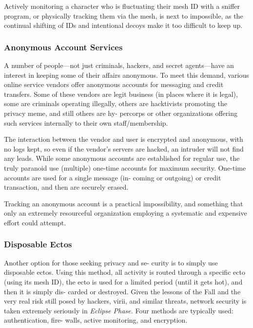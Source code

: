 Actively monitoring a character who is fluctuating 
their mesh ID with a sniffer program, or physically 
tracking them via the mesh, is next to impossible, as 
the continual shifting of IDs and intentional decoys 
make it too difficult to keep up.

\subsubsection{Anonymous Account Services}

A number of people—not just criminals, hackers, and 
secret agents—have an interest in keeping some of 
their affairs anonymous. To meet this demand, various 
online service vendors offer anonymous accounts for 
messaging and credit transfers. Some of these vendors 
are legit business (in places where it is legal), some 
are criminals operating illegally, others are hacktivists 
promoting the privacy meme, and still others are hy-
percorps or other organizations offering such services 
internally to their own staff/membership.

The interaction between the vendor and user is 
encrypted and anonymous, with no logs kept, so even 
if the vendor's servers are hacked, an intruder will 
not find any leads. While some anonymous accounts 
are established for regular use, the truly paranoid use 
(multiple) one-time accounts for maximum security. 
One-time accounts are used for a single message (in-
coming or outgoing) or credit transaction, and then 
are securely erased.

Tracking an anonymous account is a practical 
impossibility, and something that only an extremely 
resourceful organization employing a systematic and 
expensive effort could attempt.

\subsubsection{Disposable Ectos}

Another option for those seeking privacy and se-
curity is to simply use disposable ectos. Using this 
method, all activity is routed through a specific ecto 
(using its mesh ID), the ecto is used for a limited 
period (until it gets hot), and then it is simply dis-
carded or destroyed.
Given the lessons of the Fall and the very real risk still 
posed by hackers, virii, and similar threats, network 
security is taken extremely seriously in \textit{Eclipse Phase. }
Four methods are typically used: authentication, fire-
walls, active monitoring, and encryption.

